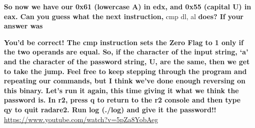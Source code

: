 \textbf{So now we have our 0x61 (lowercase A) in edx, and 0x55 (capital U) in eax. Can you guess what the next
instruction, }cmp dl, al \textbf{does? If your answer was }  
 

\textbf{You'd be correct! The cmp instruction sets the Zero Flag to 1 only if the two operands are equal. So, if the
character of the input string, `a' and the character of the password string, U, are the same, then we get to take the
jump. Feel free to keep stepping through the program and repeating our commands, but I think we've done enough
reversing on this binary. Let's run it again, this time giving it what we think the password is. In r2, press q to
return to the r2 console and then type qy to quit radare2. Run log (./log) and give it the password!! }
\url{https://www.youtube.com/watch?v=5pZa8YobAeg}
